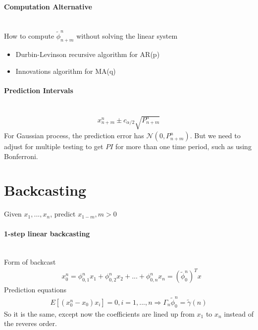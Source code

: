 \paragraph{Computation Alternative} \mbox{}\\
How to compute $\tilde{\phi}_{n+m}^n $ without solving the linear system
    \begin{itemize}
        \item Durbin-Levinson recursive algorithm for AR(p)
        \item Innovations algorithm for MA(q)
    \end{itemize}

\paragraph{Prediction Intervals} \mbox{}\\
    \begin{align*}
        x_{n+m}^n \pm c_{\alpha / 2} \sqrt{P_{n+m}^n}
    \end{align*}
For Gaussian process, the prediction error has $\mathcal{N}(0, P_{n+m}^n)$. But we need to adjust for multiple testing to get $PI$ for more than one time period, such as using Bonferroni. 



\section{Backcasting}
Given $x_1, ..., x_n$, predict $x_{1-m}, m > 0$

\paragraph{1-step linear backcasting} \mbox{}\\
Form of backcast
    \begin{align*}
        & x_0^n = \phi_{0, 1}^n x_1 + \phi_{0, 2}^n x_2 + ... + \phi_{0, n}^n x_n = (\tilde{\phi}_0^n)^T x \tag{Note now $x$ is flipped from $x_n, ...,  x_1$ to $x_1, ..., x_n$}
    \end{align*}
Prediction equations
    \begin{align*}
        E[(x_0^n - x_0)x_i] = 0, i = 1, ..., n \Longrightarrow \Gamma_n \tilde{\phi}_0^n = \tilde{\gamma}(n)
    \end{align*}
So it is the same, except now the coefficients are lined up from $x_1$ to $x_n$ instead of the reveres order. \\




